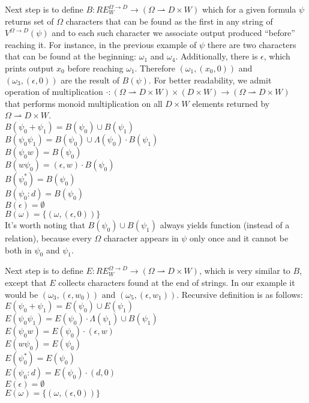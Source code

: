 Next step is to define $B:RE_W^{\Omega\rightarrow D} \rightarrow (\Omega \rightharpoonup D \times W)$ which for a given formula $\psi$ returns set of $\Omega$ characters that can be found as the first in any string of $V^{\Omega\rightarrow D}(\psi)$ and to each such character we associate output produced ``before'' reaching it. For instance, in the previous example of $\psi$ there are two characters that can be found at the beginning: $\omega_1$ and $\omega_4$. Additionally, there is $\epsilon$, which prints output $x_0$ before reaching $\omega_1$. Therefore $(\omega_1,(x_0,0))$ and $(\omega_3,(\epsilon,0))$ are the result of $B(\psi)$. For better readability, we admit operation of multiplication $\cdot : (\Omega \rightharpoonup D \times W) \times (D \times W) \rightarrow (\Omega \rightharpoonup D \times W)$ that performs monoid multiplication on all $D \times W$ elements returned by $\Omega \rightharpoonup D \times W$. \\
$B(\psi_0 + \psi_1) = B(\psi_0)\cup B(\psi_1) $ \\
$B(\psi_0 \psi_1) = B(\psi_0) \cup \Lambda(\psi_0)\cdot B(\psi_1)$ \\
$B(\psi_0 w) = B(\psi_0)$ \\
$B(w \psi_0 ) = (\epsilon,w)\cdot B(\psi_0)$ \\
$B(\psi_0^*) =  B(\psi_0)$ \\
$B(\psi_0 : d) =  B(\psi_0)$ \\
$B(\epsilon) =  \emptyset$ \\
$B(\omega) =  \{(\omega,(\epsilon,0)) \}$ \\
It's worth noting that $B(\psi_0)\cup B(\psi_1)$ always yields function  (instead of a relation), because every $\Omega$ character appears in $\psi$ only once and it cannot be both in $\psi_0$ and $\psi_1$. 

Next step is to define $E:RE_W^{\Omega\rightarrow D} \rightarrow (\Omega \rightharpoonup D \times W)$, which is very similar to $B$, except that $E$ collects characters found at the end of strings. In our example it would be $(\omega_3,(\epsilon,w_0))$ and $(\omega_5,(\epsilon,w_1))$. Recursive definition is as follows:\\ 
$E(\psi_0 + \psi_1) = E(\psi_0)\cup E(\psi_1) $ \\
$E(\psi_0 \psi_1) = E(\psi_0) \cdot \Lambda(\psi_1) \cup  B(\psi_1)$ \\
$E(\psi_0 w) = E(\psi_0) \cdot (\epsilon,w) $ \\
$E(w \psi_0 ) = E(\psi_0)$ \\
$E(\psi_0 ^*) =  E(\psi_0) $ \\
$E(\psi_0 : d) =  E(\psi_0) \cdot (d,0)$ \\
$E(\epsilon) =  \emptyset$ \\
$E(\omega) =  \{(\omega,(\epsilon,0)) \}$ 

